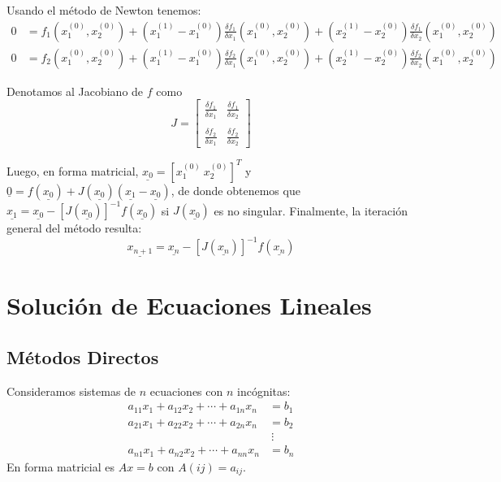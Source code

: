 Usando el método de Newton tenemos: \begin{align*}
0 &= f_1(x_1^{(0)}, x_2^{(0)}) 
+ (x_1^{(1)} - x_1^{(0)})\frac{\delta f_1}{\delta x_1} (x_1^{(0)}, x_2^{(0)})
+ (x_2^{(1)} - x_2^{(0)})\frac{\delta f_1}{\delta x_2} (x_1^{(0)}, x_2^{(0)}) \\
0 &= f_2(x_1^{(0)}, x_2^{(0)}) 
+ (x_1^{(1)} - x_1^{(0)})\frac{\delta f_2}{\delta x_1} (x_1^{(0)}, x_2^{(0)})
+ (x_2^{(1)} - x_2^{(0)})\frac{\delta f_2}{\delta x_2} (x_1^{(0)}, x_2^{(0)})
\end{align*}

Denotamos al Jacobiano de \(f\) como \[
J =
\begin{bmatrix}
\frac{\delta f_1}{\delta x_1} & \frac{\delta f_1}{\delta x_2} \\ 
\\
\frac{\delta f_2}{\delta x_1} & \frac{\delta f_2}{\delta x_2} 
\end{bmatrix}
\]

Luego, en forma matricial,
\(\underline{x_0} = [x_1^{(0)}\  x_2^{(0)}]^T\) y
\(\underline{0} = f(\underline{x_0}) + J(\underline{x_0})(\underline{x_1} - \underline{x_0})\),
de donde obtenemos que
\(\underline{x_1} = \underline{x_0} - [J(\underline{x_0})]^{-1} f(\underline{x_0})\)
si \(J(\underline{x_0})\) es no singular. Finalmente, la iteración
general del método resulta: \[
\underline{x_{n+1}} 
= \underline{x_n} - [J(\underline{x_n})]^{-1}f(\underline{x_n})
\]

\hypertarget{soluciuxf3n-de-ecuaciones-lineales}{%
\section{Solución de Ecuaciones
Lineales}\label{soluciuxf3n-de-ecuaciones-lineales}}

\hypertarget{muxe9todos-directos}{%
\subsection{Métodos Directos}\label{muxe9todos-directos}}

Consideramos sistemas de \(n\) ecuaciones con \(n\) incógnitas:
\begin{align*}
a_{11} x_1 + a_{12} x_2 + \cdots + a_{1n} x_n &=  b_1 \\
a_{21} x_1 + a_{22} x_2 + \cdots + a_{2n} x_n &=  b_2 \\
&\ \vdots \\
a_{n1} x_1 + a_{n2} x_2 + \cdots + a_{nn} x_n &=  b_n
\end{align*}
 En forma matricial es \(Ax = b\) con \(A({ij}) = a_{ij}\).

